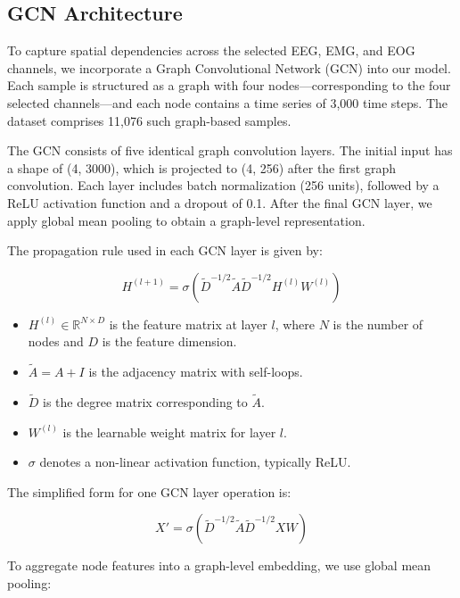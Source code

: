 \subsection{GCN Architecture}

To capture spatial dependencies across the selected EEG, EMG, and EOG channels, we incorporate a Graph Convolutional Network (GCN) into our model. Each sample is structured as a graph with four nodes—corresponding to the four selected channels—and each node contains a time series of 3,000 time steps. The dataset comprises 11,076 such graph-based samples.

The GCN consists of five identical graph convolution layers. The initial input has a shape of (4, 3000), which is projected to (4, 256) after the first graph convolution. Each layer includes batch normalization (256 units), followed by a ReLU activation function and a dropout of 0.1. After the final GCN layer, we apply global mean pooling to obtain a graph-level representation.

The propagation rule used in each GCN layer is given by:

\begin{equation}
	H^{(l+1)} = \sigma\left(\tilde{D}^{-1/2} \tilde{A} \tilde{D}^{-1/2} H^{(l)} W^{(l)}\right)
\end{equation}

\begin{itemize}
	\item $H^{(l)} \in \mathbb{R}^{N \times D}$ is the feature matrix at layer $l$, where $N$ is the number of nodes and $D$ is the feature dimension.
	\item $\tilde{A} = A + I$ is the adjacency matrix with self-loops.
	\item $\tilde{D}$ is the degree matrix corresponding to $\tilde{A}$.
	\item $W^{(l)}$ is the learnable weight matrix for layer $l$.
	\item $\sigma$ denotes a non-linear activation function, typically ReLU.
\end{itemize}

The simplified form for one GCN layer operation is:

\begin{equation}
	X' = \sigma\left(\tilde{D}^{-1/2} \tilde{A} \tilde{D}^{-1/2} X W\right)
\end{equation}

To aggregate node features into a graph-level embedding, we use global mean pooling:

